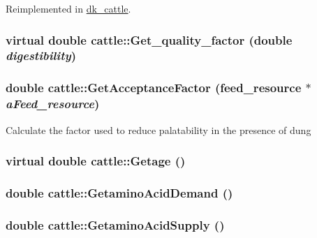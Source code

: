 Reimplemented in \hyperlink{classdk__cattle_a2188892a4f9630ccb5ee58ef7fdf26b3}{dk\_\-cattle}.\hypertarget{classcattle_a2ca11504c1a120f1b36f6bbf1572ae23}{
\subsubsection[{Get\_\-quality\_\-factor}]{\setlength{\rightskip}{0pt plus 5cm}virtual double cattle::Get\_\-quality\_\-factor (double {\em digestibility})}}
\label{classcattle_a2ca11504c1a120f1b36f6bbf1572ae23}
\hypertarget{classcattle_a532030c30439fc60896d2a6018b877ad}{
\subsubsection[{GetAcceptanceFactor}]{\setlength{\rightskip}{0pt plus 5cm}double cattle::GetAcceptanceFactor ({\bf feed\_\-resource} $\ast$ {\em aFeed\_\-resource})}}
\label{classcattle_a532030c30439fc60896d2a6018b877ad}
Calculate the factor used to reduce palatability in the presence of dung \hypertarget{classcattle_ab014adfe186a96d87be23df0c4bf47eb}{
\subsubsection[{Getage}]{\setlength{\rightskip}{0pt plus 5cm}virtual double cattle::Getage ()}}
\label{classcattle_ab014adfe186a96d87be23df0c4bf47eb}
\hypertarget{classcattle_af0ab4f6ff6d9da66b7f5cd3af963d769}{
\subsubsection[{GetaminoAcidDemand}]{\setlength{\rightskip}{0pt plus 5cm}double cattle::GetaminoAcidDemand ()}}
\label{classcattle_af0ab4f6ff6d9da66b7f5cd3af963d769}
\hypertarget{classcattle_a8b0fca6e07ddb7aadda529b88c1f1f8d}{
\subsubsection[{GetaminoAcidSupply}]{\setlength{\rightskip}{0pt plus 5cm}double cattle::GetaminoAcidSupply ()}}

